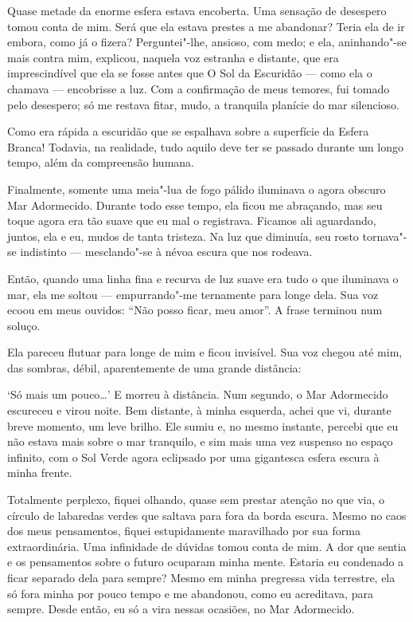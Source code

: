 Quase metade da enorme esfera estava encoberta. Uma sensação de desespero tomou conta de mim. Será que ela estava
prestes a me abandonar? Teria ela de ir embora, como já o fizera? Perguntei"-lhe, ansioso, com medo; e ela,
aninhando"-se mais contra mim, explicou, naquela voz estranha e distante, que era imprescindível que ela se fosse antes
que O Sol da Escuridão --- como ela o chamava --- encobrisse a luz. Com a confirmação de meus temores, fui tomado pelo
desespero; só me restava fitar, mudo, a tranquila planície do mar silencioso.

Como era rápida a escuridão que se espalhava sobre a superfície da Esfera Branca! Todavia, na realidade, tudo
aquilo deve ter se passado durante um longo tempo, além da compreensão humana.

Finalmente, somente uma meia"-lua de fogo pálido iluminava o agora obscuro Mar Adormecido. Durante todo esse tempo, ela
ficou me abraçando, mas seu toque agora era tão suave que eu mal o registrava. Ficamos ali aguardando, juntos, ela e
eu, mudos de tanta tristeza. Na luz que diminuía, seu rosto tornava"-se indistinto --- mesclando"-se à névoa escura que nos
rodeava.

Então, quando uma linha fina e recurva de luz suave era tudo o que iluminava o mar, ela me soltou --- empurrando"-me
ternamente para longe dela. Sua voz ecoou em meus ouvidos: “Não posso ficar, meu amor”. A frase terminou num soluço.

Ela pareceu flutuar para longe de mim e ficou invisível. Sua voz chegou até mim, das sombras, débil, aparentemente de
uma grande distância:

‘Só mais um pouco\ldots{}’ E morreu à distância. Num segundo, o Mar Adormecido escureceu e virou noite. Bem distante, à
minha esquerda, achei que vi, durante breve momento, um leve brilho. Ele sumiu e, no mesmo instante, percebi que eu
não estava mais sobre o mar tranquilo, e sim mais uma vez suspenso no espaço infinito, com o Sol Verde agora eclipsado
por uma gigantesca esfera escura à minha frente.

Totalmente perplexo, fiquei olhando, quase sem prestar atenção no que via, o círculo de labaredas verdes que saltava
para fora da borda escura. Mesmo no caos dos meus pensamentos, fiquei estupidamente maravilhado por sua forma
extraordinária. Uma infinidade de dúvidas tomou conta de mim. A dor que sentia e os pensamentos sobre o futuro ocuparam
minha mente. Estaria eu condenado a ficar separado dela para sempre? Mesmo em minha pregressa vida terrestre, ela só
fora minha por pouco tempo e me abandonou, como eu acreditava, para sempre. Desde então, eu só a vira nessas
ocasiões, no Mar Adormecido.

